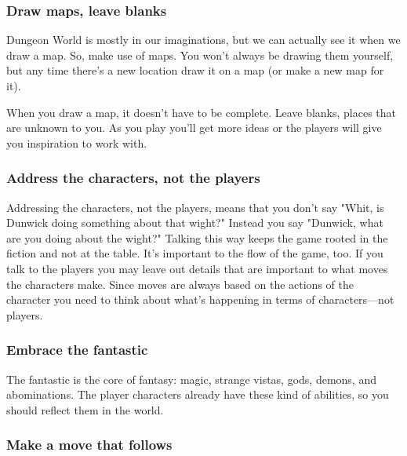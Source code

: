        
\subsubsection{Draw maps, leave blanks}      
       

Dungeon World is mostly in our imaginations, but we can actually see it when we draw a map. So, make use of maps. You won't always be drawing them yourself, but any time there's a new location draw it on a map (or make a new map for it).

       

When you draw a map, it doesn't have to be complete. Leave blanks, places that are unknown to you. As you play you'll get more ideas or the players will give you inspiration to work with.

       
\subsubsection{Address the characters, not the players}     
       

Addressing the characters, not the players, means that you don't say "Whit, is Dunwick doing something about that wight?" Instead you say "Dunwick, what are you doing about the wight?" Talking this way keeps the game rooted in the fiction and not at the table. It's important to the flow of the game, too. If you talk to the players you may leave out details that are important to what moves the characters make. Since moves are always based on the actions of the character you need to think about what's happening in terms of characters—not players.

       
\subsubsection{Embrace the fantastic}    
       

The fantastic is the core of fantasy: magic, strange vistas, gods, demons, and abominations. The player characters already have these kind of abilities, so you should reflect them in the world.

       
\subsubsection{Make a move that follows}   
       

